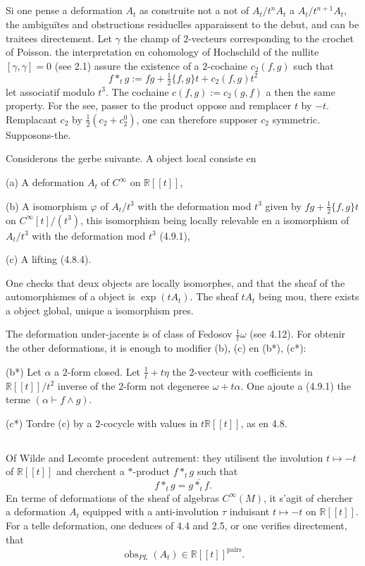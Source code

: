 \documentclass[11pt,a4paper]{article}
\theoremstyle{plain}
\theoremstyle{definition}
\DeclareMathOperator{\obs}{obs}
\newcommand{\R}{\mathbb{R}}
\begin{document}
\subsection{}
Si one pense a deformation $A_{t}$ as construite not a not of $A_{t}/t^{n}A_{t}$
a $A_{t}/t^{n+1}A_{t}$, the ambigu\"ites and obstructions residuelles apparaissent to the debut, and
can be traitees directement. Let $\gamma$ the champ of $2$-vecteurs corresponding
to the crochet of Poisson. the interpretation en cohomology of Hochschild of the nullite
$[\gamma, \gamma] = 0$ (see 2.1) assure the existence of a $2$-cochaine $c_{2}(f, g)$ such that
\begin{equation}
f *_{t} g := fg + \tfrac{1}{2}\{f,g\}t + c_{2}(f,g)t^{2} \tag{4.9.1}
\end{equation}
let associatif modulo $t^{3}$. The cochaine $c(f,g) := c_{2}(g, f)$ a then the same property.
For the see, passer to the product oppose and remplacer $t$ by $-t$. Remplacant $c_{2}$ by
$\tfrac{1}{2}(c_{2} + c_{2}^{0})$, one can therefore supposer $c_{2}$ symmetric. Supposons-the.

Considerons the gerbe suivante. A object local consiste en

(a) A deformation $A_{t}$ of $C^{\infty}$ on $\R[[t]]$,

(b) A isomorphism $\varphi$ of $A_{t}/t^{3}$ with the deformation mod $t^{3}$ given by $fg + \tfrac{1}{2}\{f,g\}t$ on $C^{\infty}[t]/(t^{3})$, this isomorphism being locally relevable en a isomorphism of $A_{t}/t^{3}$ with the deformation mod $t^{3}$ (4.9.1),

(c) A lifting (4.8.4).

One checks that deux objects are locally isomorphes, and that the sheaf of the automorphismes of a object is $\exp(tA_{t})$. The sheaf $tA_{t}$ being mou, there exists a
object global, unique a isomorphism pres.

The deformation under-jacente is of class of Fedosov $\frac{1}{t}\omega$ (see 4.12). For obtenir the other deformations, it is enough to modifier (b), (c) en (b*), (c*):

(b*) Let $\alpha$ a $2$-form closed. Let $\tfrac{1}{t} + t\eta$ the $2$-vecteur with coefficients in $\R[[t]]/t^{2}$ inverse of the $2$-form not degeneree $\omega + t\alpha$. One ajoute a (4.9.1) the terme $(\alpha \vdash f \wedge g)$.

(c*) Tordre (c) by a $2$-cocycle with values in $t\R[[t]]$, as en 4.8.

\subsection{}
Of Wilde and Lecomte procedent autrement: they utilisent the involution $t \mapsto -t$
of $\R[[t]]$ and cherchent a $*$-product $f *_{t} g$ such that
\[
f *_{t} g = \overline{g *_{t} f}.
\]
En terme of deformations of the sheaf of algebras $C^{\infty}(M)$, it s'agit of chercher a deformation $A_{t}$ equipped with a anti-involution $\tau$ induisant $t \mapsto -t$ on $\R[[t]]$. For a telle deformation, one deduces of 4.4 and 2.5, or one verifies directement, that
\[
\obs_{PL}(A_{t}) \in \R[[t]]^{\text{pairs}}.
\]
\end{document}
